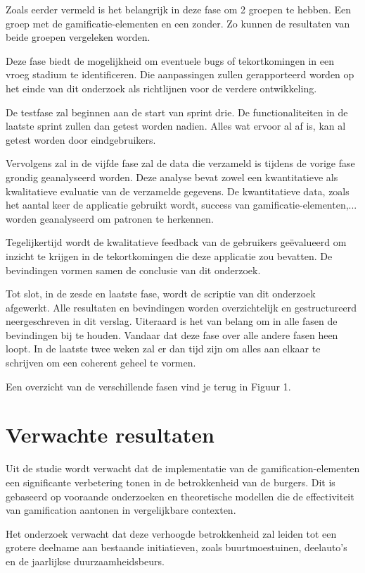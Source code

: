 \documentclass{hogent-article}
\begin{document}
Zoals eerder vermeld is het belangrijk in deze fase om 2 groepen te hebben. Een groep met de gamificatie-elementen en een zonder. Zo kunnen de resultaten van beide groepen vergeleken worden. 

Deze fase biedt de mogelijkheid om eventuele bugs of tekortkomingen in een vroeg stadium te identificeren. Die aanpassingen zullen gerapporteerd worden op het einde van dit onderzoek als richtlijnen voor de verdere ontwikkeling.

De testfase zal beginnen aan de start van sprint drie. De functionaliteiten in de laatste sprint zullen dan getest worden nadien. Alles wat ervoor al af is, kan al getest worden door eindgebruikers.

Vervolgens zal in de vijfde fase zal de data die verzameld is tijdens de vorige fase grondig geanalyseerd worden. Deze analyse bevat zowel een kwantitatieve als kwalitatieve evaluatie van de verzamelde gegevens. De kwantitatieve data, zoals het aantal keer de applicatie gebruikt wordt, success van gamificatie-elementen,... worden geanalyseerd om patronen te herkennen. 

Tegelijkertijd wordt de kwalitatieve feedback van de gebruikers geëvalueerd om inzicht te krijgen in de tekortkomingen die deze applicatie zou bevatten. De bevindingen vormen samen de conclusie van dit onderzoek.

Tot slot, in de zesde en laatste fase, wordt de scriptie van dit onderzoek afgewerkt. Alle resultaten en bevindingen worden overzichtelijk en gestructureerd neergeschreven in dit verslag. Uiteraard is het van belang om in alle fasen de bevindingen bij te houden. Vandaar dat deze fase over alle andere fasen heen loopt. In de laatste twee weken zal er dan tijd zijn om alles aan elkaar te schrijven om een coherent geheel te vormen.

Een overzicht van de verschillende fasen vind je terug in Figuur 1.

\section{Verwachte resultaten}%
\label{sec:verwachte-resultaten}
Uit de studie wordt verwacht dat de implementatie van de gamification-elementen een significante verbetering tonen in de betrokkenheid van de burgers. Dit is gebaseerd op vooraande onderzoeken en theoretische modellen die de effectiviteit van gamification aantonen in vergelijkbare contexten.

Het onderzoek verwacht dat deze verhoogde betrokkenheid zal leiden tot een grotere deelname aan bestaande initiatieven, zoals buurtmoestuinen, deelauto's en de jaarlijkse duurzaamheidsbeurs.
\end{document}
